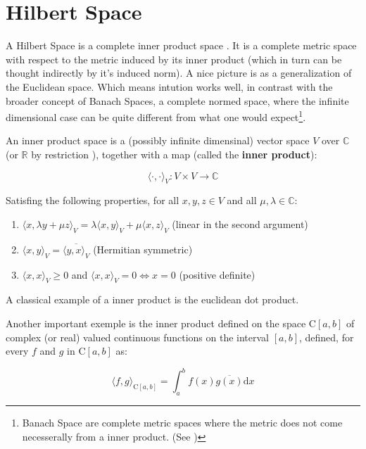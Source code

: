 
\section{Hilbert Space}
\label{s:hilbert}
A Hilbert Space is a complete inner product space \cite{HS-YN:11}. It is a
complete metric space with respect to the metric induced by its inner product
(which in turn can be thought indirectly by it's induced norm). A nice picture
is as a generalization of the Euclidean space. Which means intution works well,
in contrast with the broader concept of Banach Spaces, a complete normed space,
where the infinite dimensional case can be quite different from what one would
expect\footnote{Banach Space are complete metric spaces where the metric does
not come necesserally from a inner product. (See \citet{HS-HJNB:00})}.

An inner product space\cite{HS-HJNB:00} is a (possibly infinite dimensinal)
vector space $V$ over $\mathbb{C}$ (or $\mathbb{R}$ by restriction ), together
with a map (called the \textbf{inner product}):

\[  \langle\cdot,\cdot\rangle_{\scriptscriptstyle V}: V \times V \to \mathbb{C}
\]

Satisfing the following properties, for all $x,y,z \in V$ and all $\mu, \lambda
\in \mathbb{C}$:

\begin{enumerate}[I]
  \item \(  \langle x,\lambda y + \mu z  \rangle_{\scriptscriptstyle V} = \lambda\langle	
  x,y\rangle_ {\scriptscriptstyle V} + \mu \langle x,z \rangle_{\scriptscriptstyle V} \) (linear in the second argument)
  \item \( \langle x,y \rangle_{\scriptscriptstyle V} = \overline{\langle y,x \rangle_{\scriptscriptstyle V} } \)
  (Hermitian symmetric)
  \item  \( \langle x,x \rangle_{\scriptscriptstyle V} \geq 0 \) and \( \langle x,x \rangle_{\scriptscriptstyle V} = 0
  \Leftrightarrow x = 0 \) (positive definite)
\end{enumerate}

A classical example of a inner product is the euclidean dot product.

Another important exemple is the inner product defined on the space C$[a,b]$ of
complex (or real) valued continuous functions on the interval $[a,b]$, defined,
for every $f$ and $g$ in C$[a,b]$ as:

\begin{equation}\label{eq::func_inner}
  \langle f,g\rangle_{\scriptscriptstyle \text{C}[a,b]} = \int_a^b
  f(x)\overline{g(x)} \mathrm{d}x
\end{equation}

